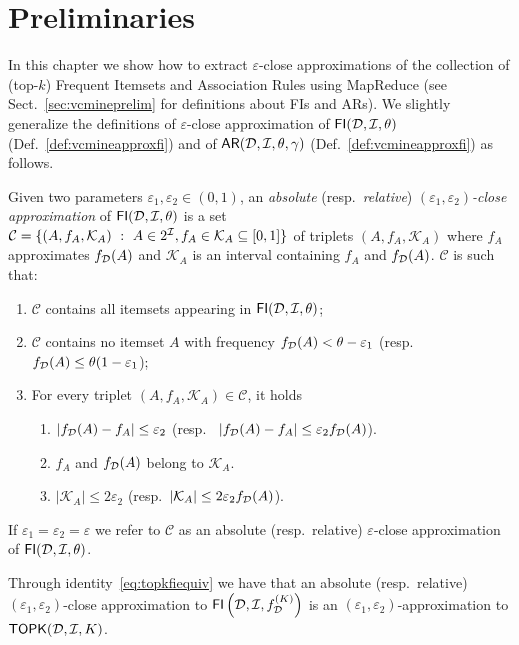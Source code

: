 \section{Preliminaries} \label{sec:parmadef}
In this chapter we show how to extract $\varepsilon$-close approximations of the
collection of (top-$k$) Frequent Itemsets and Association Rules using MapReduce
(see Sect.~\ref{sec:vcmineprelim} for definitions about FIs and ARs). We slightly
generalize the definitions of $\varepsilon$-close
approximation of $\mathsf{FI}({\cal D},{\cal I},\theta)$ (Def.~\ref{def:vcmineapproxfi}) and of
$\mathsf{AR}({\cal D},{\cal I},\theta,\gamma)$ (Def.~\ref{def:vcmineapproxfi}) as follows.

\begin{definition}\label{def:parmaeapproxfi}
  Given two parameters $\varepsilon_1,\varepsilon_2\in(0,1)$, an \emph{absolute}
  (resp.~\emph{relative}) \emph{
  $(\varepsilon_1,\varepsilon_2)$-close approximation} of
  $\mathsf{FI}({\cal D},{\cal I},\theta)$ is a set $\mathcal{C}=\{(A, f_A, \mathcal{K}_A) ~:~ A\in 2^{\cal I},
  f_A\in\mathcal{K}_A\subseteq[0,1]\}$ of triplets $(A, f_A, \mathcal{K}_A)$ where
  $f_A$ approximates $f_{\cal D}(A)$ and $\mathcal{K}_A$ is an interval containing
  $f_A$ and $f_{\cal D}(A)$.
  $\mathcal{C}$ is such that:
  \begin{enumerate}
    \item $\mathcal{C}$ contains all itemsets appearing in
      $\mathsf{FI}({\cal D},{\cal I},\theta)$;
    \item $\mathcal{C}$ contains no itemset $A$ with frequency $f_{\cal D}(A)<\theta -
      \varepsilon_1$ (resp.~ $f_{\cal D}(A)\le\theta(1-\varepsilon_1$);
    \item For every triplet $(A, f_A,\mathcal{K}_A)\in\mathcal{C}$, it holds
      \begin{enumerate}
       \item $|f_{\cal D}(A)-f_A|\le\varepsilon_2$ (resp.~
	 $|f_{\cal D}(A)-f_A|\le\varepsilon_2f_{\cal D}(A)$).
       \item $f_A$ and $f_{\cal D}(A)$ belong to $\mathcal{K}_A$.
       \item $|\mathcal{K}_A|\le 2\varepsilon_2$ (resp.~$|\mathcal{K}_A|\le
	 2\varepsilon_2f_{\cal D}(A)$).
     \end{enumerate}
  \end{enumerate}
  If $\varepsilon_1=\varepsilon_2=\varepsilon$ we refer to $\mathcal{C}$ 
  as an absolute (resp.~relative) $\varepsilon$-close approximation of
  $\mathsf{FI}({\cal D},{\cal I},\theta)$.
\end{definition} 

Through identity~\eqref{eq:topkfiequiv} we have that an absolute
(resp.~relative) $(\varepsilon_1,\varepsilon_2)$-close approximation to
$\mathsf{FI}\left({\cal D},{\cal I},f^{(K)}_{\cal D}\right)$ is an
$(\varepsilon_1,\varepsilon_2)$-approximation to $\mathsf{TOPK}({\cal D},{\cal I},K)$.

